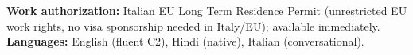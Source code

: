 \documentclass[a4paper,10pt]{article}
\begin{document}
\vspace{2pt}
{\small \textbf{Work authorization:} Italian EU Long Term Residence Permit (unrestricted EU work rights, no visa sponsorship needed in Italy/EU); available immediately. \quad \textbf{Languages:} English (fluent C2), Hindi (native), Italian (conversational).}
\end{document}
